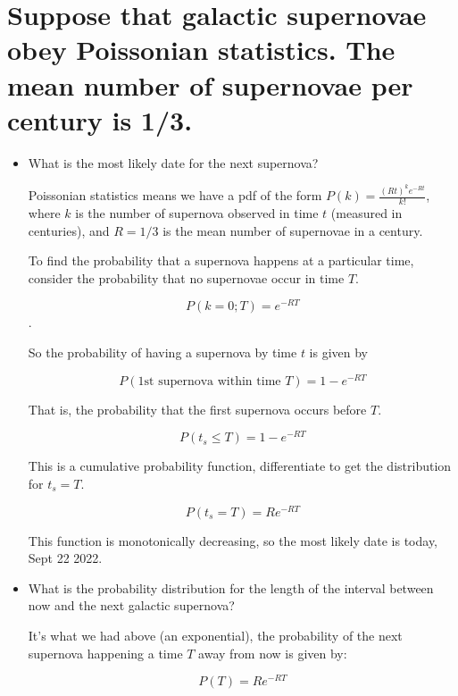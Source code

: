 \section{Suppose that galactic supernovae obey Poissonian statistics.
The mean number of supernovae per century is 1/3.}

\begin{itemize}
    \item What is the most likely date for the next supernova?

    Poissonian statistics means we have a pdf of the form
    $P(k) = \frac{(R t)^k e^{-R t}}{k!}$,
    where $k$ is the number of supernova observed in time $t$ (measured in centuries),
    and $R = 1/3$ is the mean number of supernovae in a century.

    To find the probability that a supernova happens at a particular time, consider the probability that no supernovae occur in time $T$.

    $$P(k=0;T) = e^{-R T}$$.

    So the probability of having a supernova by time $t$ is given by
    
    $$P(\text{1st supernova within time }T) = 1 - e^{-R T}$$

    That is, the probability that the first supernova occurs before $T$.

    $$P(t_s \leq T) = 1 - e^{-R T}$$

    This is a cumulative probability function, differentiate to get the distribution for $t_s=T$.

    $$P(t_s=T) = R e^{-R T}$$

    This function is monotonically decreasing, so the most likely date is today, Sept 22 2022.

    \item What is the probability distribution for the length of the interval between
    now and the next galactic supernova?

    It's what we had above (an exponential), the probability of the next supernova happening a time $T$ away from now is given by:

    $$P(T) = R e^{-R T}$$

\end{itemize}


